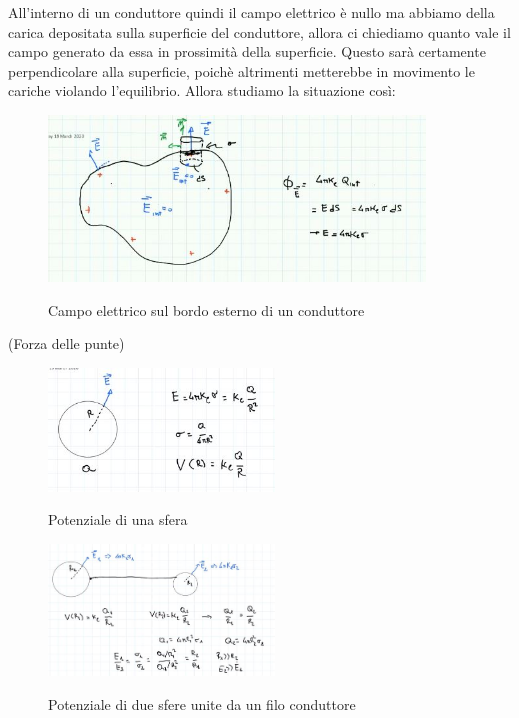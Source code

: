All'interno di un conduttore quindi il campo elettrico è nullo ma abbiamo della carica depositata sulla superficie del conduttore, allora ci chiediamo quanto vale il campo generato da essa in prossimità della superficie. Questo sarà certamente perpendicolare alla superficie, poichè altrimenti metterebbe in movimento le cariche violando l'equilibrio. Allora studiamo la situazione così:
	\begin{figure}[h]
	\begin{center}
		\includegraphics[width=10cm]{lezione9/images/5 Campo elettrico nei materiali.jpg}\\
		\caption{Campo elettrico sul bordo esterno di un conduttore}
	\end{center}
\end{figure}
\clearpage
\begin{esempio}(Forza delle punte)
	\begin{figure}[h]
	\begin{center}
		\includegraphics[width=6cm]{lezione9/images/6 Campo elettrico nei materiali.jpg}\\
		\caption{Potenziale di una sfera}
	\end{center}
\end{figure}
	\begin{figure}[h]
	\begin{center}
		\includegraphics[width=6cm]{lezione9/images/7 Campo elettrico nei materiali.jpg}\\
		\caption{Potenziale di due sfere unite da un filo conduttore}
	\end{center}
\end{figure}

\end{esempio}


